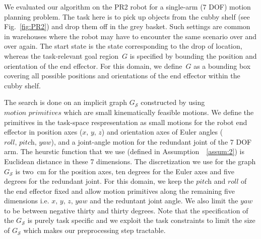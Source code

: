 \documentclass[letterpaper]{article} %
\newcommand{\calS}{\ensuremath{\mathcal{S}}\xspace}
\begin{document}
We evaluated our algorithm on the PR2 robot for a single-arm (7 DOF) motion planning problem. The task here is to pick up objects from the cubby shelf (see Fig.~\ref{fig:PR2}) and drop them off in the grey basket. Such settings are common in warehouses where the robot may have to encounter the same scenario over and over again. The start state is the state corresponding to the drop of location, whereas the task-relevant goal region~$G$ is specified by bounding the position and orientation of the end effector. For this domain, we define~$G$ as a bounding box covering all possible positions and orientations of the end effector within the cubby shelf.

The search is done on an implicit graph $G_\calS$ constructed by using $\textit{motion primitives}$ which are small kinematically feasible motions. We define the primitives in the task-space respresentation as small motions for the robot end effector in position axes ($\textit{x, y, z}$) and orientation axes of Euler angles ($\textit{roll, pitch, yaw}$), and a joint-angle motion for the redundant joint of the 7 DOF arm. The heurstic function that we use (defined in Assumption~~\ref{assum:2}) is Euclidean distance in these 7 dimensions. The discretization we use for the graph $G_\calS$ is two~cm for the position axes, ten degrees for the Euler axes and five degrees for the redundant joint. 
For this domain, we keep the $\textit{pitch}$ and $\textit{roll}$ of the end effector fixed and allow motion primitives along the remaining five dimensions i.e. $\textit{x, y, z, yaw}$ and the reduntant joint angle. We also limit the $\textit{yaw}$ to be between negative thirty and thirty degrees. Note that the specification of the $G_\calS$ is purely task specific and we exploit the task constraints to limit the size of $G_\calS$ which makes our preprocessing step tractable.
\end{document}
